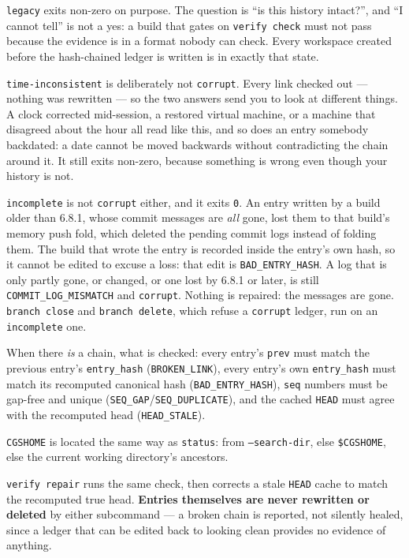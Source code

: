 \texttt{legacy} exits non-zero on purpose. The question is ``is this
history intact?'', and ``I cannot tell'' is not a yes: a build that gates on
\texttt{verify check} must not pass because the evidence is in a format nobody can
check. Every workspace created before the hash-chained ledger is written
is in exactly that state.

\texttt{time-inconsistent} is deliberately not \texttt{corrupt}. Every link
checked out --- nothing was rewritten --- so the two answers send you to
look at different things. A clock corrected mid-session, a restored virtual
machine, or a machine that disagreed about the hour all read like this, and
so does an entry somebody backdated: a date cannot be moved backwards
without contradicting the chain around it. It still exits non-zero, because
something is wrong even though your history is not.

\texttt{incomplete} is not \texttt{corrupt} either, and it exits
\texttt{0}. An entry written by a build older than 6.8.1, whose commit
messages are \emph{all} gone, lost them to that build's memory push fold,
which deleted the pending commit logs instead of folding them. The build that
wrote the entry is recorded inside the entry's own hash, so it cannot be
edited to excuse a loss: that edit is \texttt{BAD\_ENTRY\_HASH}. A log that
is only partly gone, or changed, or one lost by 6.8.1 or later, is still
\texttt{COMMIT\_LOG\_MISMATCH} and \texttt{corrupt}. Nothing is repaired:
the messages are gone. \texttt{branch close} and \texttt{branch delete},
which refuse a \texttt{corrupt} ledger, run on an \texttt{incomplete} one.

When there \emph{is} a chain, what is checked: every entry's \texttt{prev}
must match the previous entry's \texttt{entry\_hash}
(\texttt{BROKEN\_LINK}), every entry's own \texttt{entry\_hash} must match
its recomputed canonical hash (\texttt{BAD\_ENTRY\_HASH}), \texttt{seq}
numbers must be gap-free and unique
(\texttt{SEQ\_GAP}/\texttt{SEQ\_DUPLICATE}), and the cached \texttt{HEAD}
must agree with the recomputed head (\texttt{HEAD\_STALE}).

\texttt{CGSHOME} is located the same way as \texttt{status}: from
\texttt{--search-dir}, else \texttt{\$CGSHOME}, else the current working
directory's ancestors.

\texttt{verify repair} runs the same check, then corrects a stale
\texttt{HEAD} cache to match the recomputed true head. \textbf{Entries
themselves are never rewritten or deleted} by either subcommand — a broken chain is reported, not
silently healed, since a ledger that can be edited back to looking clean
provides no evidence of anything.


